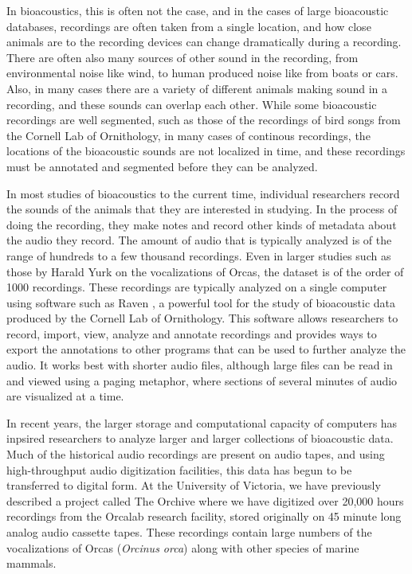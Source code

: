 \documentclass[12pt,oneside]{book}
\begin{document}
In bioacoustics, this is often not the case, and in the cases of large
bioacoustic databases, recordings are often taken from a single
location, and how close animals are to the recording devices can
change dramatically during a recording.  There are often also many
sources of other sound in the recording, from environmental noise like
wind, to human produced noise like from boats or cars. Also, in many
cases there are a variety of different animals making sound in a
recording, and these sounds can overlap each other.  While some
bioacoustic recordings are well segmented, such as those of the
recordings of bird songs from the Cornell Lab of Ornithology, in many
cases of continous recordings, the locations of the bioacoustic sounds
are not localized in time, and these recordings must be annotated and
segmented before they can be analyzed.

In most studies of bioacoustics to the current time, individual
researchers record the sounds of the animals that they are interested
in studying.  In the process of doing the recording, they make notes
and record other kinds of metadata about the audio they record.  The
amount of audio that is typically analyzed is of the range of hundreds
to a few thousand recordings.  Even in larger studies such as those by
Harald Yurk on the vocalizations of Orcas, the dataset is of the order
of 1000 recordings.  These recordings are typically analyzed on a
single computer using software such as Raven \cite{ravenpro}, a
powerful tool for the study of bioacoustic data produced by the
Cornell Lab of Ornithology.  This software allows researchers to
record, import, view, analyze and annotate recordings and provides
ways to export the annotations to other programs that can be used to
further analyze the audio.  It works best with shorter audio files,
although large files can be read in and viewed using a paging
metaphor, where sections of several minutes of audio are visualized at
a time.

In recent years, the larger storage and computational capacity of
computers has inpsired researchers to analyze larger and larger
collections of bioacoustic data.  Much of the historical audio
recordings are present on audio tapes, and using high-throughput audio
digitization facilities, this data has begun to be transferred to
digital form.  At the University of Victoria, we have previously
described a project called The Orchive \cite{sness2008} where we have
digitized over 20,000 hours recordings from the Orcalab research
facility, stored originally on 45 minute long analog audio cassette
tapes.  These recordings contain large numbers of the vocalizations of
Orcas (\textit{Orcinus orca}) along with other species of marine
mammals.
\end{document}
